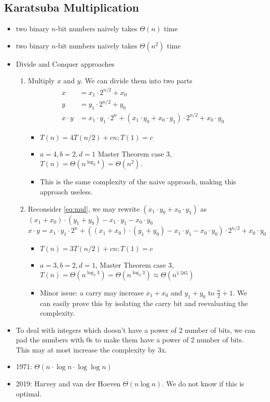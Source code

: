 \documentclass[a4paper,12pt]{article}
\begin{document}
\subsection{Karatsuba Multiplication}
\begin{itemize}
    \item {} two binary $n$-bit numbers naively takes $\Theta(n)$ time
    \item {} two binary $n$-bit numbers naively takes $\Theta(n^2)$ time
    \item Divide and Conquer approaches \begin{enumerate}
        \item Multiply $x$ and $y$. We can divide them into two parts\begin{align}
            x &= x_1\cdot 2^{n/2} + x_0\\
            y &= y_1\cdot 2^{n/2} + y_0\\
            x\cdot y &= x_1\cdot y_1\cdot 2^n + (x_1\cdot y_0 + x_0\cdot y_1)\cdot 2^{n/2} + x_0\cdot y_0 \label{eq:mul}
        \end{align}
        \begin{itemize}
            \item $T(n)=4T(n/2)+cn; T(1)=c$
            \item $a=4,b=2,d=1$ Master Theorem case 3, $T(n)=\Theta(n^{\log_2 4})=\Theta(n^2)$.
            \item This is the same complexity of the naive approach, making this approach useless.
        \end{itemize}
        
        \item Reconsider \eqref{eq:mul}, we may rewrite $(x_1\cdot y_0+x_0\cdot y_1)$ as $(x_1+x_0)\cdot(y_1+y_0)-x_1\cdot y_1-x_0\cdot y_0$
        \begin{equation}
            x\cdot y = x_1\cdot y_1\cdot 2^n + ((x_1+x_0)\cdot(y_1+y_0)-x_1\cdot y_1-x_0\cdot y_0)\cdot 2^{n/2} + x_0\cdot y_0
        \end{equation}
         
        \begin{itemize}
            \item $T(n)=3T(n/2)+cn; T(1)=c$
            \item $a=3,b=2,d=1$, Master Theorem case 3, $T(n)=\Theta(n^{\log_2 3})=\Theta(n^{\log_2 3})\approx\Theta(n^{1.585})$
            \item Minor issue: a carry may increase $x_1+x_0$ and $y_1+y_0$ to $\frac{n}{2} + 1$. We can easily prove this by isolating the carry bit and reevaluating the complexity.
        \end{itemize}
    \end{enumerate}
    \item To deal with integers which doesn't have a power of 2 number of bits, we can pad the numbers with 0s to make them have a power of 2 number of bits. This may at most increase the complexity by 3x.
    \item 1971: $\Theta(n\cdot\log n\cdot \log\log n)$
    \item 2019: Harvey and van der Hoeven $\Theta(n\log n)$. We do not know if this is optimal.
\end{itemize}
\end{document}
